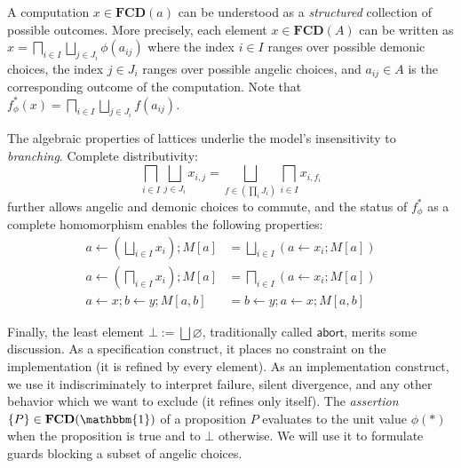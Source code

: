 \documentclass[draft,11pt]{report}
\newcommand{\kw}[1]{\ensuremath{ \mathsf{#1} }}
\begin{document}
A computation $x \in \mathbf{FCD}(a)$
can be understood as
a \emph{structured} collection of possible outcomes.
More precisely,
each element $x \in \mathbf{FCD}(A)$ can be written as
$
    x = \bigsqcap_{i \in I} \bigsqcup_{j \in J_i} \phi(a_{ij})
$
where
the index $i \in I$ ranges over possible demonic choices,
the index $j \in J_i$ ranges over possible angelic choices,
and $a_{ij} \in A$ is the corresponding outcome of the computation.
Note that
$f_\phi^*(x) = \bigsqcap_{i \in I} \bigsqcup_{j \in J_i} f(a_{ij})$.

The algebraic properties of lattices
underlie the model's insensitivity to \emph{branching}.
Complete distributivity:
\[
    \bigsqcap_{i \in I} \bigsqcup_{j \in J_i} x_{i,j} =
    \bigsqcup_{f \in (\prod_i J_i)} \bigsqcap_{i \in I} x_{i, f_i}
\]
further allows angelic and demonic choices to commute,
and the status of $f^*_\phi$ as a complete homomorphism
enables the following properties:
\begin{align*}
    a \leftarrow \left( \bigsqcup_{i \in I} x_i \right) ; M[a] &=
      \bigsqcup_{i \in I} (a \leftarrow x_i ; M[a])
    \\
    a \leftarrow \left( \bigsqcap_{i \in I} x_i \right) ; M[a] &=
      \bigsqcap_{i \in I} (a \leftarrow x_i ; M[a])
    \\
    a \leftarrow x ; b \leftarrow y ; M[a,b] &=
    b \leftarrow y ; a \leftarrow x ; M[a,b]
\end{align*}

Finally,
the least element $\bot := \bigsqcup \varnothing$,
traditionally called $\kw{abort}$,
merits some discussion.
As a specification construct,
it places no constraint on the implementation
(it is refined by every element).
As an implementation construct,
we use it indiscriminately to interpret
failure, silent divergence,
and any other behavior
which we want to exclude (it refines only itself).
The \emph{assertion} $\{P\} \in \mathbf{FCD}(\mathbbm{1})$ of a proposition $P$
evaluates to the unit value $\phi(*)$ when the proposition is true
and to $\bot$ otherwise.
We will use it to formulate guards
blocking a subset of angelic choices.

%
%
\end{document}
